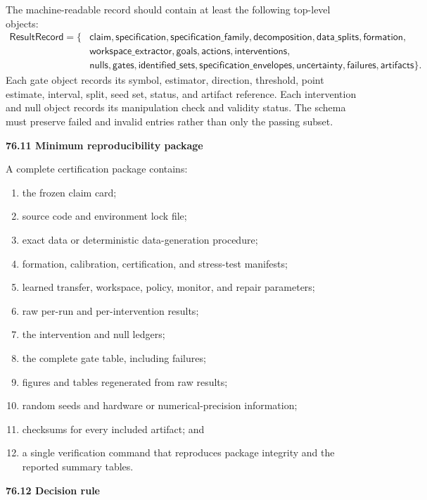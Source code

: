 \documentclass[11pt,letterpaper]{article}
\newcommand{\subtopic}[1]{%
 \vspace{0.45em}
 {\bfseries\color{AccentColor} #1\par}
}
\theoremstyle{plain}
\theoremstyle{definition}
\begin{document}
The machine-readable record should contain at least the following top-level
objects:
\[
\boxed{
\begin{aligned}
\mathsf{ResultRecord}
=\{&
\mathsf{claim},
\mathsf{specification},
\mathsf{specification\_family},
\mathsf{decomposition},
\mathsf{data\_splits},
\mathsf{formation},\\
&\mathsf{workspace\_extractor},
\mathsf{goals},
\mathsf{actions},
\mathsf{interventions},\\
&\mathsf{nulls},
\mathsf{gates},
\mathsf{identified\_sets},
\mathsf{specification\_envelopes},
\mathsf{uncertainty},
\mathsf{failures},
\mathsf{artifacts}
\}.
\end{aligned}
}
\]
Each gate object records its symbol, estimator, direction, threshold, point
estimate, interval, split, seed set, status, and artifact reference. Each
intervention and null object records its manipulation check and validity
status. The schema must preserve failed and invalid entries rather than only
the passing subset.

\subtopic{76.11 Minimum reproducibility package}

A complete certification package contains:
\begin{enumerate}
\item the frozen claim card;
\item source code and environment lock file;
\item exact data or deterministic data-generation procedure;
\item formation, calibration, certification, and stress-test manifests;
\item learned transfer, workspace, policy, monitor, and repair parameters;
\item raw per-run and per-intervention results;
\item the intervention and null ledgers;
\item the complete gate table, including failures;
\item figures and tables regenerated from raw results;
\item random seeds and hardware or numerical-precision information;
\item checksums for every included artifact; and
\item a single verification command that reproduces package integrity and the
 reported summary tables.
\end{enumerate}

\subtopic{76.12 Decision rule}
\end{document}
